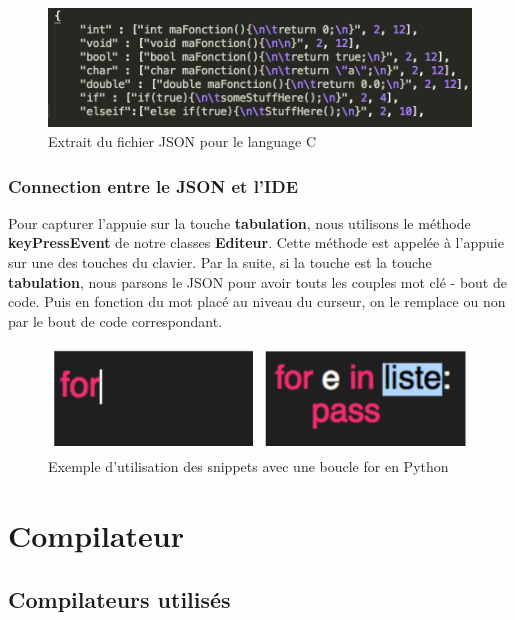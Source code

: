 \documentclass[a4paper,12pt]{article}
\begin{document}
			\begin{figure}[h!]
				\begin{center}
					\includegraphics[scale=1]{imgs/exempleJSON}
					\caption{Extrait du fichier JSON pour le language C}
				\end{center}
			\end{figure}

		\subsubsection{Connection entre le JSON et l'IDE}

			Pour capturer l'appuie sur la touche \textbf{tabulation}, nous utilisons le méthode \textbf{keyPressEvent} de notre classes \textbf{Editeur}. Cette méthode est appelée à l'appuie sur une des touches du clavier. Par la suite, si la touche est la touche \textbf{tabulation}, nous parsons le JSON pour avoir touts les couples mot clé - bout de code. Puis en fonction du mot placé au niveau du curseur, on le remplace ou non par le bout de code correspondant.

			\begin{figure}[h!]
				\begin{center}
					\includegraphics[scale=0.7]{imgs/exampleFor}
					\caption{Exemple d'utilisation des snippets avec une boucle for en Python}
				\end{center}
			\end{figure}

\section{Compilateur}

	\subsection{Compilateurs utilisés}
\end{document}

